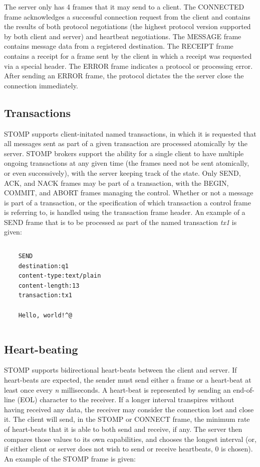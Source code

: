 \documentclass[conference, letterpaper]{IEEEtran}
\begin{document}
The server only has 4 frames that it may send to a client. The CONNECTED frame acknowledges a successful connection request from the client and contains the results of both protocol negotiations (the highest protocol version supported by both client and server) and heartbeat negotiations. The MESSAGE frame contains message data from a registered destination. The RECEIPT frame contains a receipt for a frame sent by the client in which a receipt was requested via a special header. The ERROR frame indicates a protocol or processing error. After sending an ERROR frame, the protocol dictates the the server close the connection immediately.

\subsection{Transactions}
STOMP supports client-initated named transactions, in which it is requested that all messages sent as part of a given transaction are processed atomically by the server. STOMP brokers support the ability for a single client to have multiple ongoing transactions at any given time (the frames need not be sent atomically, or even successively), with the server keeping track of the state. Only SEND, ACK, and NACK frames may be part of a transaction, with the BEGIN, COMMIT, and ABORT frames managing the control. Whether or not a message is part of a transaction, or the specification of which transaction a control frame is referring to, is handled using the transaction frame header. An example of a SEND frame that is to be processed as part of the named transaction \textit{tx1} is given:


\begin{verbatim}
\end{verbatim}
\begin{verbatim}
    SEND
    destination:q1
    content-type:text/plain
    content-length:13
    transaction:tx1

    Hello, world!^@
\end{verbatim}
\begin{verbatim}
\end{verbatim}

\subsection{Heart-beating}
STOMP supports bidirectional heart-beats between the client and server. If heart-beats are expected, the sender must send either a frame or a heart-beat at least once every \textit{n} milliseconds. A heart-beat is represented by sending an end-of-line (EOL) character to the receiver. If a longer interval transpires without having received any data, the receiver may consider the connection lost and close it. The client will send, in the STOMP or CONNECT frame, the minimum rate of heart-beats that it is able to both send and receive, if any. The server then compares those values to its own capabilities, and chooses the longest interval (or, if either client or server does not wish to send or receive heartbeats, 0 is chosen). An example of the STOMP frame is given:
\end{document}
